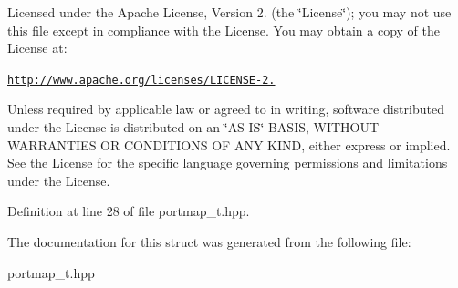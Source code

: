 Licensed under the Apache License, Version 2. (the \char`\"{}\+License\char`\"{}); you may not use this file except in compliance with the License. You may obtain a copy of the License at\+:

\href{http://www.apache.org/licenses/LICENSE-2.0}{\tt http\+://www.\+apache.\+org/licenses/\+L\+I\+C\+E\+N\+S\+E-\/2.}

Unless required by applicable law or agreed to in writing, software distributed under the License is distributed on an \char`\"{}\+A\+S I\+S\char`\"{} B\+A\+S\+IS, W\+I\+T\+H\+O\+UT W\+A\+R\+R\+A\+N\+T\+I\+ES OR C\+O\+N\+D\+I\+T\+I\+O\+NS OF A\+NY K\+I\+ND, either express or implied. See the License for the specific language governing permissions and limitations under the License. 

Definition at line 28 of file portmap\+\_\+t.\+hpp.



The documentation for this struct was generated from the following file\+:\begin{DoxyCompactItemize}
\item 
portmap\+\_\+t.\+hpp\end{DoxyCompactItemize}
